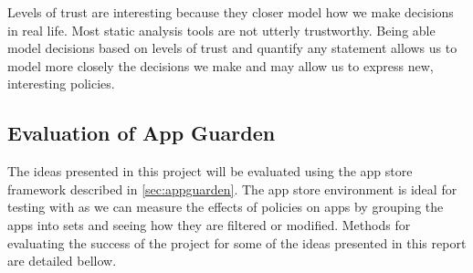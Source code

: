 \documentclass[a4paper,sfsidenotes]{%
  article%
}
\begin{document}
Levels of trust are interesting because they closer model how we make decisions
in real life.  Most static analysis tools are not utterly trustworthy. Being
able model decisions based on levels of trust and quantify any statement allows
us to model more closely the decisions we make and may allow us to express new,
interesting policies.


\subsection{Evaluation of App Guarden}

The ideas presented in this project will be evaluated using the app store
framework described in \autoref{sec:appguarden}.  The app store environment is
ideal for testing with as we can measure the effects of policies on apps by
grouping the apps into sets and seeing how they are filtered or modified.  
Methods for evaluating the success of the project for some of the ideas
presented in this report are detailed bellow.
\end{document}
